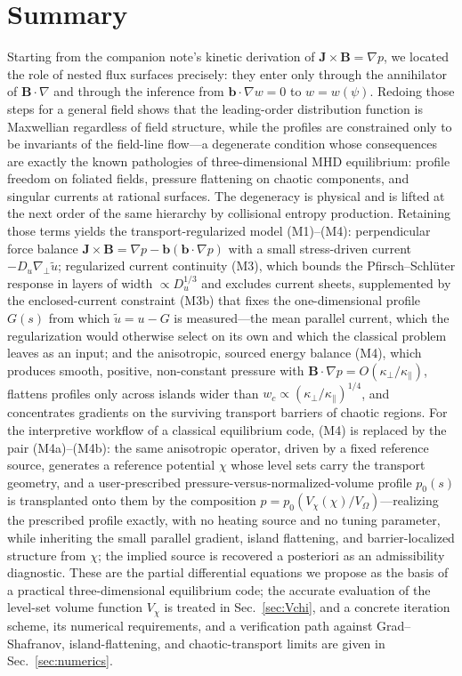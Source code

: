 \documentclass[english]{article}
\newcommand{\bB}{\mathbf{B}}
\newcommand{\bJ}{\mathbf{J}}
\newcommand{\bb}{\mathbf{b}}
\newcommand{\gradperp}{\nabla_{\!\perp}}
\begin{document}
\section{Summary}
\label{sec:summary}

Starting from the companion note's kinetic derivation of $\bJ\times\bB=\nabla p$, we located the
role of nested flux surfaces precisely: they enter only through the annihilator of
$\bB\cdot\nabla$ and through the inference from $\bb\cdot\nabla w=0$ to $w=w(\psi)$. Redoing those
steps for a general field shows that the leading-order distribution function is Maxwellian
regardless of field structure, while the profiles are constrained only to be invariants of the
field-line flow---a degenerate condition whose consequences are exactly the known pathologies of
three-dimensional MHD equilibrium: profile freedom on foliated fields, pressure flattening on
chaotic components, and singular currents at rational surfaces. The degeneracy is physical and is
lifted at the next order of the same hierarchy by collisional entropy production. Retaining those
terms yields the transport-regularized model (M1)--(M4): perpendicular force balance
$\bJ\times\bB=\nabla p-\bb(\bb\cdot\nabla p)$ with a small stress-driven current
$-D_u\gradperp\tilde u$; regularized current continuity (M3), which bounds the
Pfirsch--Schl\"uter response in layers of width $\propto D_u^{1/3}$ and excludes current sheets,
supplemented by the enclosed-current constraint (M3b) that fixes the one-dimensional profile
$G(s)$ from which $\tilde u=u-G$ is measured---the mean parallel current, which the regularization
would otherwise select on its own and which the classical problem leaves as an input; and the anisotropic,
sourced energy balance (M4), which produces smooth, positive, non-constant pressure with
$\bB\cdot\nabla p=O(\kappa_\perp/\kappa_\parallel)$, flattens profiles only across islands wider
than $w_c\propto(\kappa_\perp/\kappa_\parallel)^{1/4}$, and concentrates gradients on the surviving
transport barriers of chaotic regions. For the interpretive workflow of a classical equilibrium
code, (M4) is replaced by the pair (M4a)--(M4b): the same anisotropic operator, driven by a fixed
reference source, generates a reference potential $\chi$ whose level sets carry the transport
geometry, and a user-prescribed pressure-versus-normalized-volume profile $p_0(s)$ is transplanted onto them
by the composition $p=p_0(V_\chi(\chi)/V_\Omega)$---realizing the prescribed profile exactly, with no
heating source and no tuning parameter, while inheriting the small parallel gradient, island
flattening, and barrier-localized structure from $\chi$; the implied source is recovered a
posteriori as an admissibility diagnostic. These are the partial differential equations we propose
as the basis of a practical three-dimensional equilibrium code; the accurate evaluation of the
level-set volume function $V_\chi$ is treated in Sec.~\ref{sec:Vchi}, and a concrete iteration
scheme, its numerical requirements, and a verification path against Grad--Shafranov,
island-flattening, and chaotic-transport limits are given in Sec.~\ref{sec:numerics}.
\end{document}
